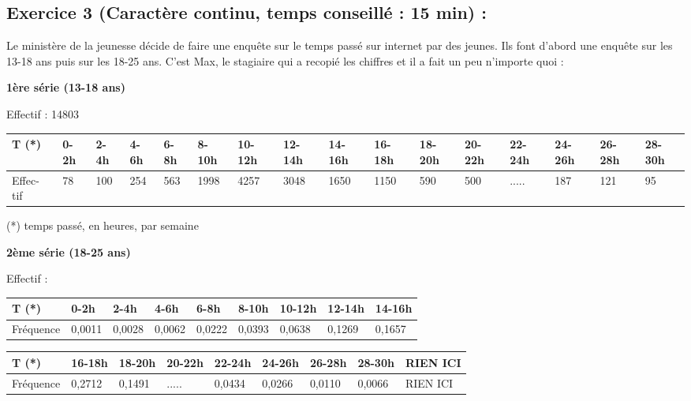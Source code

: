\subsection*{Exercice 3 (Caractère continu, temps conseillé : 15 min) : }
Le ministère de la jeunesse décide de faire une enquête sur le temps passé sur internet par des jeunes. Ils font d'abord une enquête sur les 13-18 ans puis sur les 18-25 ans. C'est Max, le stagiaire qui a recopié les chiffres et il a fait un peu n'importe quoi : \newline


\textbf{1ère série (13-18 ans)}\newline


Effectif : 14803\newline


\begin{tabularx}{\linewidth}{|X|X|X|X|X|X|X|X|X|X|X|X|X|X|X|X|}
\hline
T (*) & 0-2h  & 2-4h & 4-6h & 6-8h & 8-10h & 10-12h & 12-14h & 14-16h & 16-18h & 18-20h & 20-22h & 22-24h & 24-26h & 26-28h & 28-30h\\ \hline     
Effec- tif & 78 & 100 & 254 & 563 & 1998 & 4257 & 3048 & 1650 & 1150 & 590 & 500 & ..... & 187 & 121 & 95 \\ \hline
\end{tabularx}\newline


(*) temps passé, en heures, par semaine\newline

\textbf{2ème série (18-25 ans)}\newline

Effectif : \newline

\begin{tabularx}{\linewidth}{|X|X|X|X|X|X|X|X|X|}
\hline
T (*) & 0-2h  & 2-4h & 4-6h & 6-8h & 8-10h & 10-12h & 12-14h & 14-16h\\ \hline     
Fréquence & 0,0011 & 0,0028 & 0,0062 & 0,0222 & 0,0393 & 0,0638 & 0,1269 & 0,1657\\ \hline
\end{tabularx}\newline
\begin{tabularx}{\linewidth}{|X|X|X|X|X|X|X|X|X|}
\hline
T (*)  & 16-18h & 18-20h & 20-22h & 22-24h & 24-26h & 26-28h & 28-30h & RIEN ICI\\ \hline     
Fréquence  & 0,2712 & 0,1491 & ..... & 0,0434 & 0,0266 & 0,0110 & 0,0066 & RIEN ICI \\ \hline
\end{tabularx}\newline

